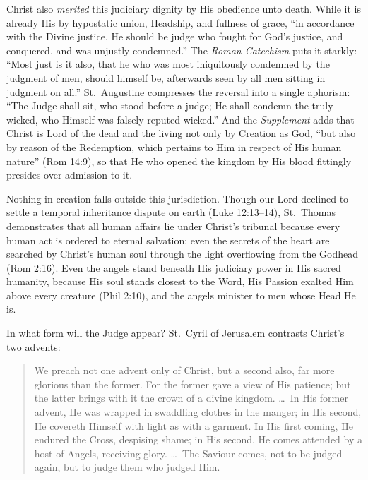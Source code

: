 Christ also \textit{merited} this judiciary dignity by His obedience unto death. While it is already His by hypostatic union, Headship, and fullness of grace, ``in accordance with the Divine justice, He should be judge who fought for God's justice, and conquered, and was unjustly condemned.'' The \textit{Roman Catechism} puts it starkly: ``Most just is it also, that he who was most iniquitously condemned by the judgment of men, should himself be, afterwards seen by all men sitting in judgment on all.'' St.\ Augustine compresses the reversal into a single aphorism: ``The Judge shall sit, who stood before a judge; He shall condemn the truly wicked, who Himself was falsely reputed wicked.'' And the \textit{Supplement} adds that Christ is Lord of the dead and the living not only by Creation as God, ``but also by reason of the Redemption, which pertains to Him in respect of His human nature'' (Rom 14:9), so that He who opened the kingdom by His blood fittingly presides over admission to it.

Nothing in creation falls outside this jurisdiction. Though our Lord declined to settle a temporal inheritance dispute on earth (Luke 12:13--14), St.\ Thomas demonstrates that all human affairs lie under Christ's tribunal because every human act is ordered to eternal salvation; even the secrets of the heart are searched by Christ's human soul through the light overflowing from the Godhead (Rom 2:16). Even the angels stand beneath His judiciary power in His sacred humanity, because His soul stands closest to the Word, His Passion exalted Him above every creature (Phil 2:10), and the angels minister to men whose Head He is.

In what form will the Judge appear? St.\ Cyril of Jerusalem contrasts Christ's two advents:

\begin{quote}
We preach not one advent only of Christ, but a second also, far more glorious than the former. For the former gave a view of His patience; but the latter brings with it the crown of a divine kingdom. \dots\ In His former advent, He was wrapped in swaddling clothes in the manger; in His second, He covereth Himself with light as with a garment. In His first coming, He endured the Cross, despising shame; in His second, He comes attended by a host of Angels, receiving glory. \dots\ The Saviour comes, not to be judged again, but to judge them who judged Him.
\end{quote}

